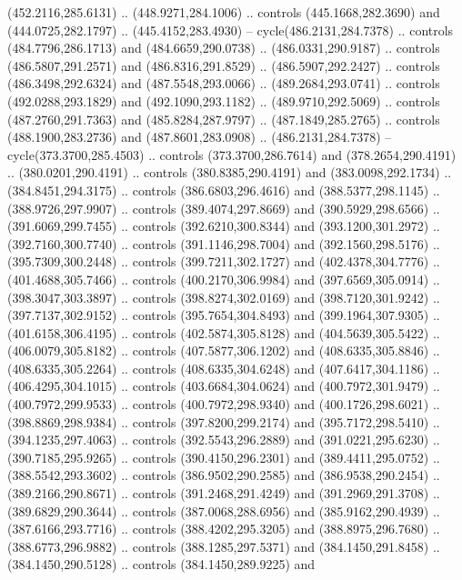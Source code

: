 \begin{scope}[cm={{1.25,0.0,0.0,-1.25,(0.0,743.43331)}}]
    (452.2116,285.6131) .. (448.9271,284.1006) .. controls (445.1668,282.3690) and
    (444.0725,282.1797) .. (445.4152,283.4930) -- cycle(486.2131,284.7378) ..
    controls (484.7796,286.1713) and (484.6659,290.0738) .. (486.0331,290.9187) ..
    controls (486.5807,291.2571) and (486.8316,291.8529) .. (486.5907,292.2427) ..
    controls (486.3498,292.6324) and (487.5548,293.0066) .. (489.2684,293.0741) ..
    controls (492.0288,293.1829) and (492.1090,293.1182) .. (489.9710,292.5069) ..
    controls (487.2760,291.7363) and (485.8284,287.9797) .. (487.1849,285.2765) ..
    controls (488.1900,283.2736) and (487.8601,283.0908) .. (486.2131,284.7378) --
    cycle(373.3700,285.4503) .. controls (373.3700,286.7614) and
    (378.2654,290.4191) .. (380.0201,290.4191) .. controls (380.8385,290.4191) and
    (383.0098,292.1734) .. (384.8451,294.3175) .. controls (386.6803,296.4616) and
    (388.5377,298.1145) .. (388.9726,297.9907) .. controls (389.4074,297.8669) and
    (390.5929,298.6566) .. (391.6069,299.7455) .. controls (392.6210,300.8344) and
    (393.1200,301.2972) .. (392.7160,300.7740) .. controls (391.1146,298.7004) and
    (392.1560,298.5176) .. (395.7309,300.2448) .. controls (399.7211,302.1727) and
    (402.4378,304.7776) .. (401.4688,305.7466) .. controls (400.2170,306.9984) and
    (397.6569,305.0914) .. (398.3047,303.3897) .. controls (398.8274,302.0169) and
    (398.7120,301.9242) .. (397.7137,302.9152) .. controls (395.7654,304.8493) and
    (399.1964,307.9305) .. (401.6158,306.4195) .. controls (402.5874,305.8128) and
    (404.5639,305.5422) .. (406.0079,305.8182) .. controls (407.5877,306.1202) and
    (408.6335,305.8846) .. (408.6335,305.2264) .. controls (408.6335,304.6248) and
    (407.6417,304.1186) .. (406.4295,304.1015) .. controls (403.6684,304.0624) and
    (400.7972,301.9479) .. (400.7972,299.9533) .. controls (400.7972,298.9340) and
    (400.1726,298.6021) .. (398.8869,298.9384) .. controls (397.8200,299.2174) and
    (395.7172,298.5410) .. (394.1235,297.4063) .. controls (392.5543,296.2889) and
    (391.0221,295.6230) .. (390.7185,295.9265) .. controls (390.4150,296.2301) and
    (389.4411,295.0752) .. (388.5542,293.3602) .. controls (386.9502,290.2585) and
    (386.9538,290.2454) .. (389.2166,290.8671) .. controls (391.2468,291.4249) and
    (391.2969,291.3708) .. (389.6829,290.3644) .. controls (387.0068,288.6956) and
    (385.9162,290.4939) .. (387.6166,293.7716) .. controls (388.4202,295.3205) and
    (388.8975,296.7680) .. (388.6773,296.9882) .. controls (388.1285,297.5371) and
    (384.1450,291.8458) .. (384.1450,290.5128) .. controls (384.1450,289.9225) and

\end{scope}
